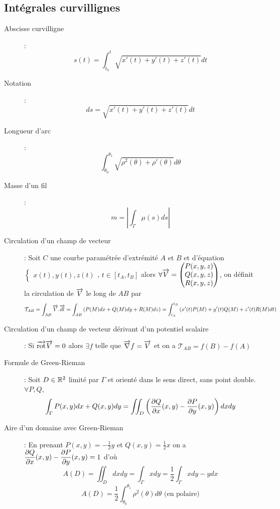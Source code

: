 \subsection{Intégrales curvillignes}
\begin{description}
\item[Abscisse curvilligne] :
    \[
        s(t)=\int_{t_0}^t\sqrt{x'(t)+y'(t)+z'(t)}dt
    \]
\item[Notation] :
    \[
        ds=\sqrt{x'(t)+y'(t)+z'(t)}dt
    \]
\item[Longueur d'arc] :
    \[
        \int_{\theta_0}^{\theta_1}\sqrt{\rho^2(\theta)+\rho'(\theta)}d\theta
    \]
\item[Masse d'un fil] :
    \[
        m=\left|\int_\Gamma\mu(s)ds\right|
    \]
\item[Circulation d'un champ de vecteur] : Soit $C$ une courbe paramétrée d'extrémité $A$ et $B$ et d'équation
    $\begin{cases}x(t),y(t),z(t)\end{cases}$, $t\in[t_A,t_B]$ alors $\forall\overrightarrow{V}=\begin{pmatrix}P(x,y,z)\\ Q(x,y,z) \\ R(x,y,z)\end{pmatrix}$, on définit la circulation de $\overrightarrow{V}$
    le long de $AB$ par
    \[
        \mathcal T_{AB}=
        \int_{AB}\overrightarrow{V}.\overrightarrow{dl}=
        \int_{AB}\left(P(M)dx+Q(M)dy+R(M)dz\right)=
        \int_{t_A}^{t_B}\left(
            x'(t)P(M)+
            y'(t)Q(M)+
            z'(t)R(M)
            dt
        \right)
    \]
\item[Circulation d'un champ de vecteur dérivant d'un potentiel scalaire] : Si $\overrightarrow{\textrm{rot}}\overrightarrow{V}=0$ alors $\exists f$ telle que $\overrightarrow{\nabla} f=\overrightarrow{V}$ et on a
    $\mathcal T_{AB}=f(B)-f(A)$
\item[Formule de Green-Rieman] : Soit $D\in\mathbb{R}^2$ limité par $\Gamma$ et orienté dans le sens direct,
    sans point double. $\forall P,Q$,
    \[
        \int_\Gamma P(x,y)dx+Q(x,y)dy=
        \iint_D\left(
            \dfrac{\partial Q}{\partial x}(x,y)-
            \dfrac{\partial P}{\partial y}(x,y)
        \right)dxdy
    \]
\item[Aire d'un domaine avec Green-Rieman] : En prenant $P(x,y)=-\frac{1}{2}y$ et $Q(x,y)=\frac{1}{2}x$
    on a $\dfrac{\partial Q}{\partial x}(x,y)-\dfrac{\partial P}{\partial y}(x,y)=1$ d'où
    \[
        A(D)=\iint_Ddxdy=\int_\Gamma xdy=\frac{1}{2}\int_\Gamma xdy-ydx
    \]
    \[
        A(D)=\frac{1}{2}\int_{\theta_0}^{\theta_1}\rho^2(\theta)d\theta
        \textrm{ (en polaire)}
    \]
\end{description}
